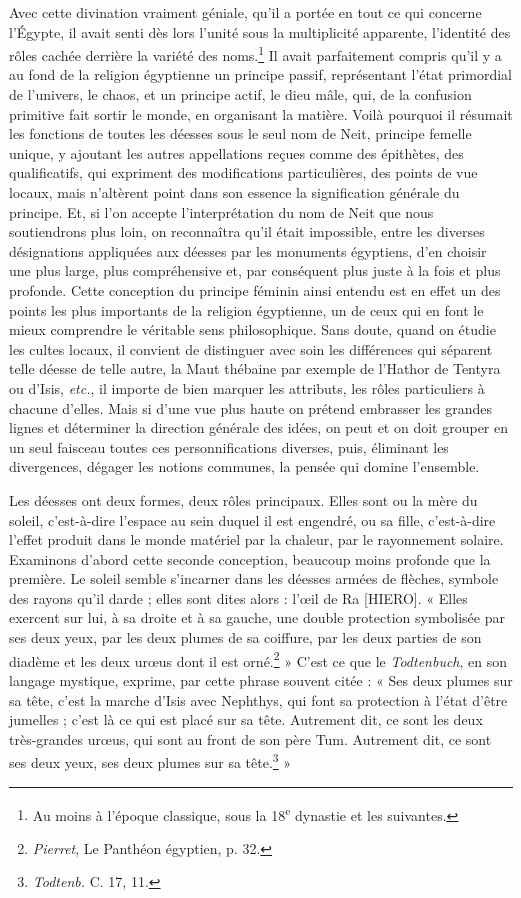 \documentclass[a4paper, 11pt, oneside]{article}
\begin{document}
Avec cette divination vraiment géniale, qu'il a portée en tout ce qui concerne l'Égypte, il avait senti dès lors l'unité sous la multiplicité apparente, l'identité des rôles cachée derrière la variété des noms.\footnote{Au moins à l'époque classique, sous la 18\textsuperscript{e} dynastie et les suivantes.} Il avait parfaitement compris qu'il y a au fond de la religion égyptienne un principe passif, représentant l'état primordial de l'univers, le chaos, et un principe actif, le dieu mâle, qui, de la confusion primitive fait sortir le monde, en organisant la matière. Voilà pourquoi il résumait les fonctions de toutes les déesses sous le seul nom de Neit, principe femelle unique, y ajoutant les autres appellations reçues comme des épithètes, des qualificatifs, qui expriment des modifications particulières, des points de vue locaux, mais n'altèrent point dans son essence la signification générale du principe. Et, si l'on accepte l'interprétation du nom de Neit que nous soutiendrons plus loin, on reconnaîtra qu'il était impossible, entre les diverses désignations appliquées aux déesses par les monuments égyptiens, d'en choisir une plus large, plus compréhensive et, par conséquent plus juste à la fois et plus profonde. Cette conception du principe féminin ainsi entendu est en effet un des points les plus importants de la religion égyptienne, un de ceux qui en font le mieux comprendre le véritable sens philosophique. Sans doute, quand on étudie les cultes locaux, il convient de distinguer avec soin les différences qui séparent telle déesse de telle autre, la Maut thébaine par exemple de l'Hathor de Tentyra ou d'Isis, \emph{etc.}, il importe de bien marquer les attributs, les rôles particuliers à chacune d'elles. Mais si d'une vue plus haute on prétend embrasser les grandes lignes et déterminer la direction générale des idées, on peut et on doit grouper en un seul faisceau toutes ces personnifications diverses, puis, éliminant les divergences, dégager les notions communes, la pensée qui domine l'ensemble.

Les déesses ont deux formes, deux rôles principaux. Elles sont ou la mère du soleil, c'est-à-dire l'espace au sein duquel il est engendré, ou sa fille, c'est-à-dire l'effet produit dans le monde matériel par la chaleur, par le rayonnement solaire. Examinons d'abord cette seconde conception, beaucoup moins profonde que la première. Le soleil semble s'incarner dans les déesses armées de flèches, symbole des rayons qu'il darde ; elles sont dites alors : l'œil de Ra [HIERO]. « Elles exercent sur lui, à sa droite et à sa gauche, une double protection symbolisée par ses deux yeux, par les deux plumes de sa coiffure, par les deux parties de son diadème et les deux urœus dont il est orné.\footnote{\emph{Pierret}, Le Panthéon égyptien, p. 32.} » C'est ce que le \emph{Todtenbuch}, en son langage mystique, exprime, par cette phrase souvent citée : « Ses deux plumes sur sa tête, c'est la marche d'Isis avec Nephthys, qui font sa protection à l'état d'être jumelles ; c'est là ce qui est placé sur sa tête. Autrement dit, ce sont les deux très-grandes urœus, qui sont au front de son père Tum. Autrement dit, ce sont ses deux yeux, ses deux plumes sur sa tête.\footnote{\emph{Todtenb.} C. 17, 11.} »
\end{document}
